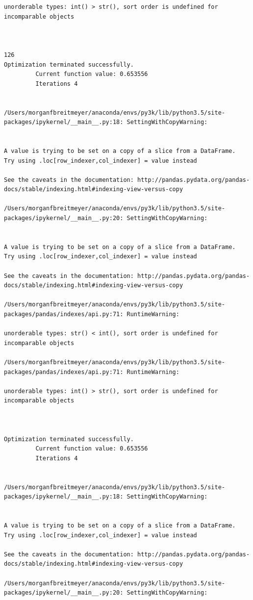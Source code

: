 \begin{lstlisting}
unorderable types: int() > str(), sort order is undefined for incomparable objects



126
Optimization terminated successfully.
         Current function value: 0.653556
         Iterations 4


/Users/morganfbreitmeyer/anaconda/envs/py3k/lib/python3.5/site-packages/ipykernel/__main__.py:18: SettingWithCopyWarning:


A value is trying to be set on a copy of a slice from a DataFrame.
Try using .loc[row_indexer,col_indexer] = value instead

See the caveats in the documentation: http://pandas.pydata.org/pandas-docs/stable/indexing.html#indexing-view-versus-copy

/Users/morganfbreitmeyer/anaconda/envs/py3k/lib/python3.5/site-packages/ipykernel/__main__.py:20: SettingWithCopyWarning:


A value is trying to be set on a copy of a slice from a DataFrame.
Try using .loc[row_indexer,col_indexer] = value instead

See the caveats in the documentation: http://pandas.pydata.org/pandas-docs/stable/indexing.html#indexing-view-versus-copy

/Users/morganfbreitmeyer/anaconda/envs/py3k/lib/python3.5/site-packages/pandas/indexes/api.py:71: RuntimeWarning:

unorderable types: str() < int(), sort order is undefined for incomparable objects

/Users/morganfbreitmeyer/anaconda/envs/py3k/lib/python3.5/site-packages/pandas/indexes/api.py:71: RuntimeWarning:

unorderable types: int() > str(), sort order is undefined for incomparable objects



Optimization terminated successfully.
         Current function value: 0.653556
         Iterations 4


/Users/morganfbreitmeyer/anaconda/envs/py3k/lib/python3.5/site-packages/ipykernel/__main__.py:18: SettingWithCopyWarning:


A value is trying to be set on a copy of a slice from a DataFrame.
Try using .loc[row_indexer,col_indexer] = value instead

See the caveats in the documentation: http://pandas.pydata.org/pandas-docs/stable/indexing.html#indexing-view-versus-copy

/Users/morganfbreitmeyer/anaconda/envs/py3k/lib/python3.5/site-packages/ipykernel/__main__.py:20: SettingWithCopyWarning:



\end{lstlisting}

